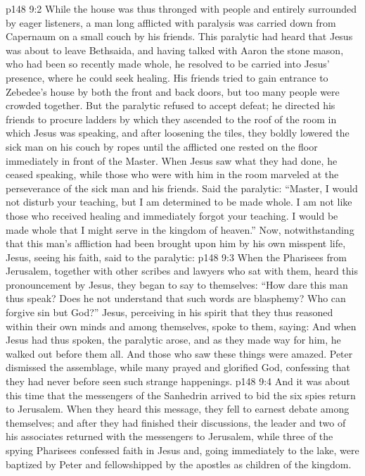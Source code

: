 \vs p148 9:2 While the house was thus thronged with people and entirely surrounded by eager listeners, a man long afflicted with paralysis was carried down from Capernaum on a small couch by his friends. This paralytic had heard that Jesus was about to leave Bethsaida, and having talked with Aaron the stone mason, who had been so recently made whole, he resolved to be carried into Jesus’ presence, where he could seek healing. His friends tried to gain entrance to Zebedee’s house by both the front and back doors, but too many people were crowded together. But the paralytic refused to accept defeat; he directed his friends to procure ladders by which they ascended to the roof of the room in which Jesus was speaking, and after loosening the tiles, they boldly lowered the sick man on his couch by ropes until the afflicted one rested on the floor immediately in front of the Master. When Jesus saw what they had done, he ceased speaking, while those who were with him in the room marveled at the perseverance of the sick man and his friends. Said the paralytic: “Master, I would not disturb your teaching, but I am determined to be made whole. I am not like those who received healing and immediately forgot your teaching. I would be made whole that I might serve in the kingdom of heaven.” Now, notwithstanding that this man’s affliction had been brought upon him by his own misspent life, Jesus, seeing his faith, said to the paralytic: 
\vs p148 9:3 When the Pharisees from Jerusalem, together with other scribes and lawyers who sat with them, heard this pronouncement by Jesus, they began to say to themselves: “How dare this man thus speak? Does he not understand that such words are blasphemy? Who can forgive sin but God?” Jesus, perceiving in his spirit that they thus reasoned within their own minds and among themselves, spoke to them, saying:  And when Jesus had thus spoken, the paralytic arose, and as they made way for him, he walked out before them all. And those who saw these things were amazed. Peter dismissed the assemblage, while many prayed and glorified God, confessing that they had never before seen such strange happenings.
\vs p148 9:4 \pc And it was about this time that the messengers of the Sanhedrin arrived to bid the six spies return to Jerusalem. When they heard this message, they fell to earnest debate among themselves; and after they had finished their discussions, the leader and two of his associates returned with the messengers to Jerusalem, while three of the spying Pharisees confessed faith in Jesus and, going immediately to the lake, were baptized by Peter and fellowshipped by the apostles as children of the kingdom.
